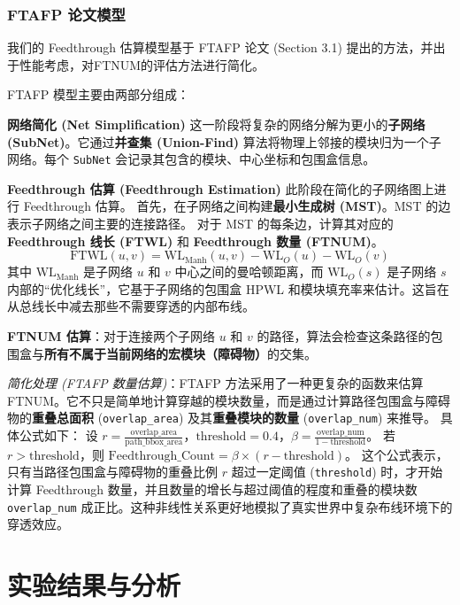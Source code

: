 \documentclass[conference]{IEEEtran}
\begin{document}
\subsubsection{FTAFP 论文模型}
我们的 Feedthrough 估算模型基于 FTAFP 论文 (Section 3.1) \cite{10.1145/3658617.3697728}提出的方法，并出于性能考虑，对FTNUM的评估方法进行简化。

FTAFP 模型主要由两部分组成：

\textbf{网络简化 (Net Simplification)} %
这一阶段将复杂的网络分解为更小的\textbf{子网络 (SubNet)}。它通过\textbf{并查集 (Union-Find)} 算法将物理上邻接的模块归为一个子网络。每个 \texttt{SubNet} 会记录其包含的模块、中心坐标和包围盒信息。

\textbf{Feedthrough 估算 (Feedthrough Estimation)} %
此阶段在简化的子网络图上进行 Feedthrough 估算。
首先，在子网络之间构建\textbf{最小生成树 (MST)}。MST 的边表示子网络之间主要的连接路径。
对于 MST 的每条边，计算其对应的 \textbf{Feedthrough 线长 (FTWL)} 和 \textbf{Feedthrough 数量 (FTNUM)}。
\begin{equation*}
    \text{FTWL}(u, v) = \text{WL}_{\text{Manh}}(u, v) - \text{WL}_O(u) - \text{WL}_O(v)
\end{equation*}
其中 $\text{WL}_{\text{Manh}}$ 是子网络 $u$ 和 $v$ 中心之间的曼哈顿距离，而 $\text{WL}_O(s)$ 是子网络 $s$ 内部的“优化线长”，它基于子网络的包围盒 HPWL 和模块填充率来估计。这旨在从总线长中减去那些不需要穿透的内部布线。

\textbf{FTNUM 估算}：对于连接两个子网络 $u$ 和 $v$ 的路径，算法会检查这条路径的包围盒与\textbf{所有不属于当前网络的宏模块（障碍物）}的交集。

\textit{简化处理 (FTAFP 数量估算)}：FTAFP 方法采用了一种更复杂的函数来估算 FTNUM。它不只是简单地计算穿越的模块数量，而是通过计算路径包围盒与障碍物的\textbf{重叠总面积} (\texttt{overlap\_area}) 及其\textbf{重叠模块的数量} (\texttt{overlap\_num}) 来推导。
具体公式如下：
设 $r = \frac{\text{overlap\_area}}{\text{path\_bbox\_area}}$，$\text{threshold} = 0.4$，$\beta = \frac{\text{overlap\_num}}{1 - \text{threshold}}$。
若 $r > \text{threshold}$，则 $\text{Feedthrough\_Count} = \beta \times (r - \text{threshold})$。
这个公式表示，只有当路径包围盒与障碍物的重叠比例 $r$ 超过一定阈值 (\texttt{threshold}) 时，才开始计算 Feedthrough 数量，并且数量的增长与超过阈值的程度和重叠的模块数 \texttt{overlap\_num} 成正比。这种非线性关系更好地模拟了真实世界中复杂布线环境下的穿透效应。

\section{实验结果与分析}
\end{document}
